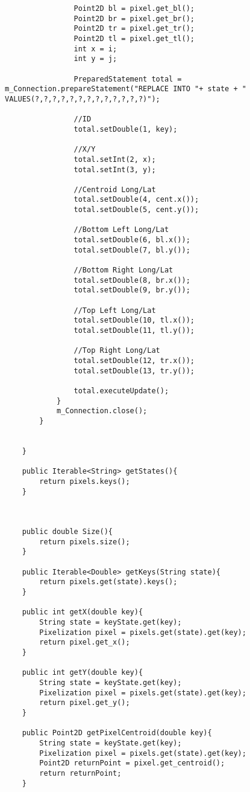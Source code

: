 \begin{verbatim}
                Point2D bl = pixel.get_bl();
                Point2D br = pixel.get_br();
                Point2D tr = pixel.get_tr();
                Point2D tl = pixel.get_tl();
                int x = i;
                int y = j;

                PreparedStatement total = m_Connection.prepareStatement("REPLACE INTO "+ state + " VALUES(?,?,?,?,?,?,?,?,?,?,?,?,?)");

                //ID
                total.setDouble(1, key);

                //X/Y
                total.setInt(2, x);
                total.setInt(3, y);

                //Centroid Long/Lat
                total.setDouble(4, cent.x());
                total.setDouble(5, cent.y());

                //Bottom Left Long/Lat
                total.setDouble(6, bl.x());
                total.setDouble(7, bl.y());

                //Bottom Right Long/Lat
                total.setDouble(8, br.x());
                total.setDouble(9, br.y());

                //Top Left Long/Lat
                total.setDouble(10, tl.x());
                total.setDouble(11, tl.y());

                //Top Right Long/Lat
                total.setDouble(12, tr.x());
                total.setDouble(13, tr.y());

                total.executeUpdate();
            }
            m_Connection.close();
        }


    }

    public Iterable<String> getStates(){
        return pixels.keys();
    }



    public double Size(){
        return pixels.size();
    }

    public Iterable<Double> getKeys(String state){
        return pixels.get(state).keys();
    }

    public int getX(double key){
        String state = keyState.get(key);
        Pixelization pixel = pixels.get(state).get(key);
        return pixel.get_x();
    }

    public int getY(double key){
        String state = keyState.get(key);
        Pixelization pixel = pixels.get(state).get(key);
        return pixel.get_y();
    }

    public Point2D getPixelCentroid(double key){
        String state = keyState.get(key);
        Pixelization pixel = pixels.get(state).get(key);
        Point2D returnPoint = pixel.get_centroid();
        return returnPoint;
    }


\end{verbatim}
